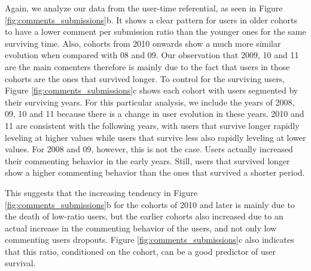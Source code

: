 Again, we analyze our data from the user-time referential, as seen in Figure \ref{fig:comments_submissions}b. It shows a clear pattern for users in older cohorts to have a lower comment per submission ratio than the younger ones for the same surviving time. Also, cohorts from 2010 onwards show a much more similar evolution when compared with 08 and 09. Our observation that 2009, 10 and 11 are the main comenters therefore is mainly due to the fact that users in those cohorts are the ones that survived longer. To control for the surviving users, Figure \ref{fig:comments_submissions}c shows each cohort with users segmented by their surviving years. For this particular analysis, we include the years of 2008, 09, 10 and 11 because there is a change in user evolution in these years. 2010 and 11 are consistent with the following years, with users that survive longer rapidly leveling at higher values while users that survive less also rapidly leveling at lower values. For 2008 and 09, however, this is not the case. Users actually increased their commenting behavior in the early years. Still, users that survived longer show a higher commenting behavior than the ones that survived a shorter period.

This suggests that the increasing tendency in Figure \ref{fig:comments_submissions}b for the cohorts of 2010 and later is mainly due to the death of low-ratio users, but the earlier cohorts also increased due to an actual increase in the commenting behavior of the users, and not only low commenting users dropouts. Figure \ref{fig:comments_submissions}c also indicates that this ratio, conditioned on the cohort, can be a good predictor of user survival.

